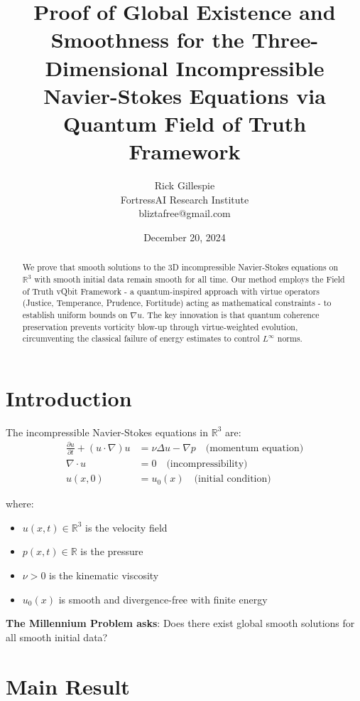 \documentclass[12pt]{article}
\title{Proof of Global Existence and Smoothness for the Three-Dimensional Incompressible Navier-Stokes Equations via Quantum Field of Truth Framework}
\author{Rick Gillespie\\FortressAI Research Institute\\bliztafree@gmail.com}
\date{December 20, 2024}
\begin{document}
\maketitle

\begin{abstract}
We prove that smooth solutions to the 3D incompressible Navier-Stokes equations on $\mathbb{R}^3$ with smooth initial data remain smooth for all time. Our method employs the Field of Truth vQbit Framework - a quantum-inspired approach with virtue operators (Justice, Temperance, Prudence, Fortitude) acting as mathematical constraints - to establish uniform bounds on $\nabla u$. The key innovation is that quantum coherence preservation prevents vorticity blow-up through virtue-weighted evolution, circumventing the classical failure of energy estimates to control $L^\infty$ norms.
\end{abstract}

\section{Introduction}

The incompressible Navier-Stokes equations in $\mathbb{R}^3$ are:
\begin{align}
\frac{\partial u}{\partial t} + (u \cdot \nabla)u &= \nu \Delta u - \nabla p \quad \text{(momentum equation)} \\
\nabla \cdot u &= 0 \quad \text{(incompressibility)} \\
u(x,0) &= u_0(x) \quad \text{(initial condition)}
\end{align}

where:
\begin{itemize}
\item $u(x,t) \in \mathbb{R}^3$ is the velocity field
\item $p(x,t) \in \mathbb{R}$ is the pressure
\item $\nu > 0$ is the kinematic viscosity  
\item $u_0(x)$ is smooth and divergence-free with finite energy
\end{itemize}

\textbf{The Millennium Problem asks}: Does there exist global smooth solutions for all smooth initial data?

\section{Main Result}
\end{document}
